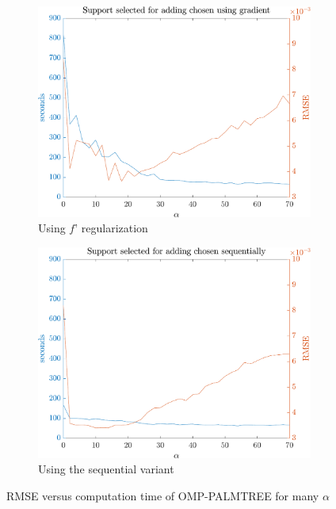 \begin{figure}[!h] \centering
\begin{subfigure}[b]{0.49\textwidth}\centering
\includegraphics[width=\textwidth]{figures/tree-learn/gradient-vs-sequential/gradient_used.pdf}
	\caption{Using $f’$ regularization}\label{fig_cmp_rmse_vs_time_grad}
\end{subfigure}
\begin{subfigure}[b]{0.49\textwidth}\centering
\includegraphics[width=\textwidth]{figures/tree-learn/gradient-vs-sequential/gradient_not_used.pdf} 
	\caption{Using the sequential variant}\label{fig_cmp_rmse_vs_time_seq}
\end{subfigure}	
\caption{RMSE versus computation time of OMP-PALMTREE for many $\alpha$}\label{fig_cmp_rmse_vs_time}
\end{figure}
\FloatBarrier

